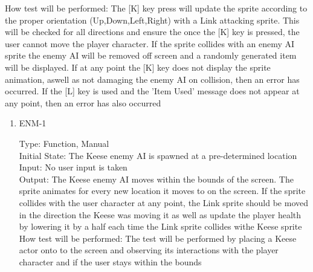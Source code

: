\documentclass[12pt, titlepage]{article}
\begin{document}
\begin{enumerate}
	How test will be performed: The [K] key press will update the sprite according to the proper orientation (Up,Down,Left,Right) with a Link attacking sprite. This will be checked for all directions and ensure the once the [K] key is pressed, the user cannot move the player character. If the sprite collides with an enemy AI sprite the enemy AI will be removed off screen and a randomly generated item will be displayed. If at any point the [K] key does not display the sprite animation, aswell as not damaging the enemy AI on collision, then an error has occurred. If the [L] key is used and the 'Item Used' message does not appear at any point, then an error has also occurred
	
\end{enumerate}

\begin{enumerate}
	\subsection{Enemy Testing}
	
	\item{ENM-1\\}
	
	Type: Function, Manual\\
	
	Initial State: The Keese enemy AI is spawned at a pre-determined location\\
	
	Input: No user input is taken\\
	
	Output: The Keese enemy AI moves within the bounds of the screen. The sprite animates for every new location it moves to on the screen. If the sprite collides with the user character at any point, the Link sprite should be moved in the direction the Keese was moving it as well as update the player health by lowering it by a half each time the Link sprite collides withe Keese sprite\\
	
	How test will be performed: The test will be performed by placing a Keese actor onto to the screen and observing its interactions with the player character and if the user stays within the bounds\\
\end{enumerate}
\end{document}
